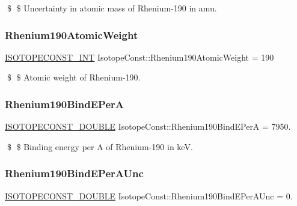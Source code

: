 \$ \$ Uncertainty in atomic mass of Rhenium-\/190 in amu. \mbox{\label{group___isotope_const-_rhenium-_re190_gae73841f8eacc8e5532abce9079b28731}} 
\subsubsection{\texorpdfstring{Rhenium190\+Atomic\+Weight}{Rhenium190AtomicWeight}}
{\footnotesize\ttfamily \mbox{\hyperlink{group___isotope_const-_macros_ga5f18360b3e99483a35c32d789e62621c}{I\+S\+O\+T\+O\+P\+E\+C\+O\+N\+S\+T\+\_\+\+I\+NT}} Isotope\+Const\+::\+Rhenium190\+Atomic\+Weight = 190}

\$ \$ Atomic weight of Rhenium-\/190. \mbox{\label{group___isotope_const-_rhenium-_re190_gaac5ce78faa320b0c475cad5b7fa6bf5e}} 
\subsubsection{\texorpdfstring{Rhenium190\+Bind\+E\+PerA}{Rhenium190BindEPerA}}
{\footnotesize\ttfamily \mbox{\hyperlink{group___isotope_const-_macros_ga8f45a7272ce02c0b4c65c44636ed719a}{I\+S\+O\+T\+O\+P\+E\+C\+O\+N\+S\+T\+\_\+\+D\+O\+U\+B\+LE}} Isotope\+Const\+::\+Rhenium190\+Bind\+E\+PerA = 7950.}

\$ \$ Binding energy per A of Rhenium-\/190 in keV. \mbox{\label{group___isotope_const-_rhenium-_re190_gad1a2c6887666a49f5b2444848bfdc8af}} 
\subsubsection{\texorpdfstring{Rhenium190\+Bind\+E\+Per\+A\+Unc}{Rhenium190BindEPerAUnc}}
{\footnotesize\ttfamily \mbox{\hyperlink{group___isotope_const-_macros_ga8f45a7272ce02c0b4c65c44636ed719a}{I\+S\+O\+T\+O\+P\+E\+C\+O\+N\+S\+T\+\_\+\+D\+O\+U\+B\+LE}} Isotope\+Const\+::\+Rhenium190\+Bind\+E\+Per\+A\+Unc = 0.}


